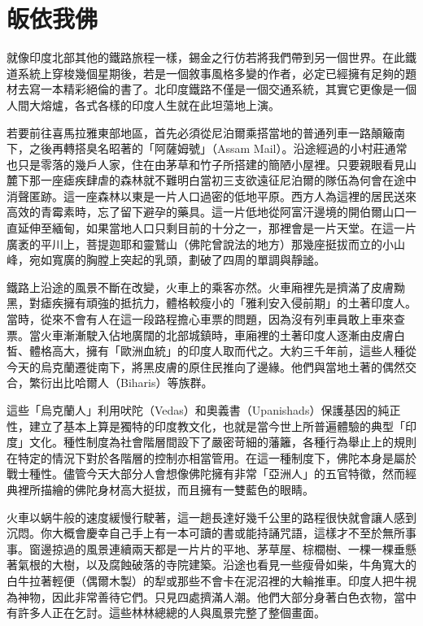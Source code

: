 \chapter{皈依我佛}

就像印度北部其他的鐵路旅程一樣，錫金之行仿若將我們帶到另一個世界。在此鐵道系統上穿梭幾個星期後，若是一個敘事風格多變的作者，必定已經擁有足夠的題材去寫一本精彩絕倫的書了。北印度鐵路不僅是一個交通系統，其實它更像是一個人間大熔爐，各式各樣的印度人生就在此坦蕩地上演。

若要前往喜馬拉雅東部地區，首先必須從尼泊爾乘搭當地的普通列車一路顛簸南下，之後再轉搭臭名昭著的「阿薩姆號」（Assam
Mail）。沿途經過的小村莊通常也只是零落的幾戶人家，住在由茅草和竹子所搭建的簡陋小屋裡。只要親眼看見山麓下那一座瘧疾肆虐的森林就不難明白當初三支欲遠征尼泊爾的隊伍為何會在途中消聲匿跡。這一座森林以東是一片人口過密的低地平原。西方人為這裡的居民送來高效的青霉素時，忘了留下避孕的藥具。這一片低地從阿富汗邊境的開伯爾山口一直延伸至緬甸，如果當地人口只剩目前的十分之一，那裡會是一片天堂。在這一片廣袤的平川上，菩提迦耶和靈鷲山（佛陀曾說法的地方）那幾座挺拔而立的小山峰，宛如寬廣的胸膛上突起的乳頭，劃破了四周的單調與靜謐。

鐵路上沿途的風景不斷在改變，火車上的乘客亦然。火車廂裡先是擠滿了皮膚黝黑，對瘧疾擁有頑強的抵抗力，體格較瘦小的「雅利安入侵前期」的土著印度人。當時，從來不會有人在這一段路程擔心車票的問題，因為沒有列車員敢上車來查票。當火車漸漸駛入佔地廣闊的北部城鎮時，車廂裡的土著印度人逐漸由皮膚白皙、體格高大，擁有「歐洲血統」的印度人取而代之。大約三千年前，這些人種從今天的烏克蘭遷徙南下，將黑皮膚的原住民推向了邊緣。他們與當地土著的偶然交合，繁衍出比哈爾人（Biharis）等族群。

這些「烏克蘭人」利用吠陀（Vedas）和奧義書（Upanishads）保護基因的純正性，建立了基本上算是獨特的印度教文化，也就是當今世上所普遍體驗的典型「印度」文化。種性制度為社會階層間設下了嚴密苛細的藩籬，各種行為舉止上的規則在特定的情況下對於各階層的控制亦相當管用。在這一種制度下，佛陀本身是屬於戰士種性。儘管今天大部分人會想像佛陀擁有非常「亞洲人」的五官特徵，然而經典裡所描繪的佛陀身材高大挺拔，而且擁有一雙藍色的眼睛。

火車以蜗牛般的速度緩慢行駛著，這一趟長達好幾千公里的路程很快就會讓人感到沉悶。你大概會慶幸自己手上有一本可讀的書或能持誦咒語，這樣才不至於無所事事。窗邊掠過的風景連續兩天都是一片片的平地、茅草屋、棕櫚樹、一棵一棵垂懸著氣根的大樹，以及腐蝕破落的寺院建築。沿途也看見一些瘦骨如柴，牛角寬大的白牛拉著輕便（偶爾木製）的犁或那些不會卡在泥沼裡的大輪推車。印度人把牛視為神物，因此非常善待它們。只見四處擠滿人潮。他們大部分身著白色衣物，當中有許多人正在乞討。這些林林總總的人與風景完整了整個畫面。

